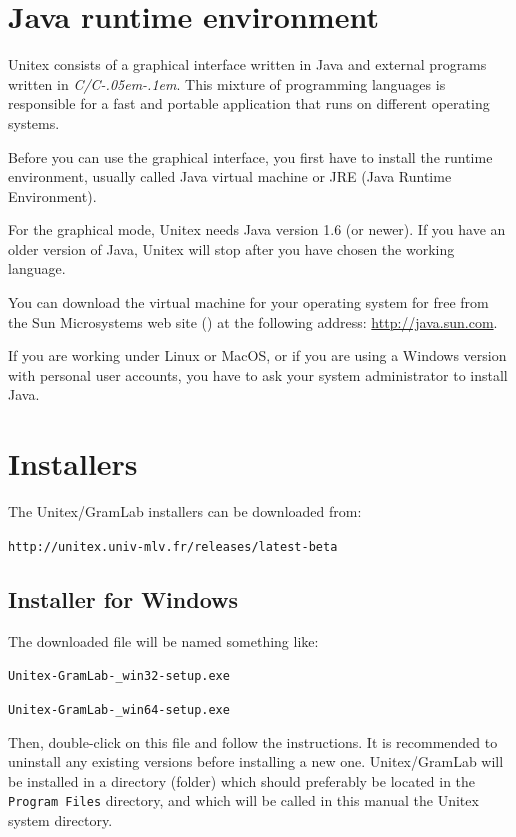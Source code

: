 \section{Java runtime environment}
Unitex consists of a graphical interface written in Java and external programs
written in \textit{C/C\kern-.05em\raisebox{.5ex}{++}\kern-.1em}. This mixture of
programming languages is responsible for a fast and portable application that
runs on different operating systems.

\bigskip
\noindent Before you can use the graphical interface, you first have to install the runtime
environment, usually called Java virtual machine  or
JRE (Java Runtime Environment).

\bigskip
\noindent For the graphical mode, Unitex needs Java version 1.6 (or newer). If you have an
older version of Java, Unitex will stop after you have chosen the working language.

\bigskip
\noindent You can download the virtual machine for your operating system for free from the
Sun Microsystems web site (\cite{site-java}) at the following address:
\url{http://java.sun.com}.

\bigskip
\noindent If you are working under Linux or MacOS, or if you are using a Windows version
with personal user accounts, you have to ask your system administrator to install Java.

\section{Installers}
The Unitex/GramLab installers can be downloaded from:

\verb+http://unitex.univ-mlv.fr/releases/latest-beta+

\subsection{Installer for Windows}
The downloaded file will be named something like:

{\tt Unitex-GramLab-\UnitexVersion{}\_win32-setup.exe}

{\tt{U}nitex-GramLab-\UnitexVersion{}\_win64-setup.exe}

\noindent Then, double-click on this file and follow the instructions. It is recommended to uninstall any
existing versions before installing a new one. Unitex/GramLab will be installed in a directory
(folder) which should preferably be located in the \verb+Program Files+
directory, and which will be called in this manual the Unitex system directory.


